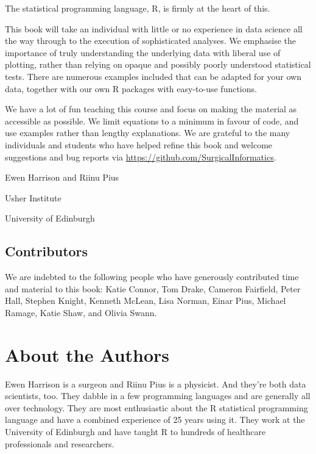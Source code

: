\documentclass[
  12pt,
  krantz2]{krantz}
\begin{document}
The statistical programming language, R, is firmly at the heart of this.

This book will take an individual with little or no experience in data science all the way through to the execution of sophisticated analyses.
We emphasise the importance of truly understanding the underlying data with liberal use of plotting, rather than relying on opaque and possibly poorly understood statistical tests.
There are numerous examples included that can be adapted for your own data, together with our own R packages with easy-to-use functions.

We have a lot of fun teaching this course and focus on making the material as accessible as possible.
We limit equations to a minimum in favour of code, and use examples rather than lengthy explanations.
We are grateful to the many individuals and students who have helped refine this book and welcome suggestions and bug reports via \url{https://github.com/SurgicalInformatics}.

\begin{flushright}
Ewen Harrison and Riinu Pius

Usher Institute

University of Edinburgh  
\end{flushright}

\hypertarget{contributors}{%
\section*{Contributors}\label{contributors}}


We are indebted to the following people who have generously contributed time and material to this book: Katie Connor, Tom Drake, Cameron Fairfield, Peter Hall, Stephen Knight, Kenneth McLean, Lisa Norman, Einar Pius, Michael Ramage, Katie Shaw, and Olivia Swann.

\hypertarget{about-the-authors}{%
\chapter*{About the Authors}\label{about-the-authors}}


Ewen Harrison is a surgeon and Riinu Pius is a physicist.
And they're both data scientists, too.
They dabble in a few programming languages and are generally all over technology.
They are most enthusiastic about the R statistical programming language and have a combined experience of 25 years using it.
They work at the University of Edinburgh and have taught R to hundreds of healthcare professionals and researchers.
\end{document}
